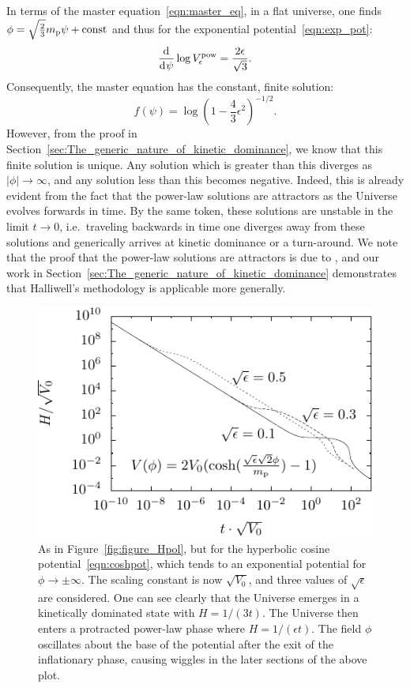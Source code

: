 In terms of the master equation~\eqref{eqn:master_eq}, in a flat universe, one finds $\phi = \sqrt{\frac{2}{3}}m_{\mathrm{p}} \psi + \mathrm{const} $ and thus for the exponential potential~\eqref{eqn:exp_pot}:
%
\begin{equation}
  \frac{\operatorname{d}^{}\!{}}{\operatorname{d}^{}\!{\psi}} \log V^\mathrm{pow}_\epsilon = \frac{2\epsilon}{\sqrt{3}}. 
\end{equation}
%
Consequently, the master equation has the constant, finite solution:
%
\begin{equation}
  f(\psi) = \log{\left(1-\frac{4}{3}\epsilon^2\right)}^{-1/2}.
  \label{eqn:uf_power_law}
\end{equation}
%
However, from the proof in Section~\ref{sec:The_generic_nature_of_kinetic_dominance}, we know that this finite solution is unique. Any solution which is greater than this diverges as $|\phi|\to\infty$, and any solution less than this becomes negative.  Indeed, this is already evident from the fact that the power-law solutions are attractors as the Universe evolves forwards in time. By the same token, these solutions are unstable in the limit $t \to 0$, i.e.\ traveling backwards in time one diverges away from these solutions and generically arrives at kinetic dominance or a turn-around.  We note that the proof that the power-law solutions are attractors is due to \citet{halliwell_scalar_1987}, and our work in Section~\ref{sec:The_generic_nature_of_kinetic_dominance} demonstrates that Halliwell's methodology is applicable more generally.

%
\begin{figure}[ht]
  \includegraphics[width=\textwidth]{chapter_kinetic_dominance/figures/Hlam}
  \caption{As in Figure~\protect\ref{fig:figure_Hpol}, but for the hyperbolic cosine potential~\protect\eqref{eqn:coshpot}, which tends to an exponential potential for $\phi \to \pm\infty$. The scaling constant is now $\sqrt{V_0}$, and three values of $\sqrt{\epsilon}$ are considered. One can see clearly that the Universe emerges in a kinetically dominated state with $H=1/(3t)$. The Universe then enters a protracted power-law phase where $H = 1/(\epsilon t)$. The field $\phi$ oscillates about the base of the potential after the exit of the inflationary phase, causing wiggles in the later sections of the above plot.\label{fig:figure_Hlam}}
\end{figure}
%

